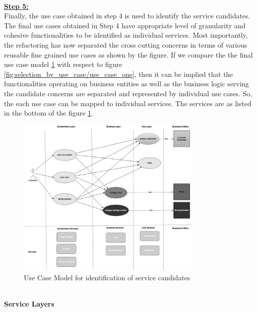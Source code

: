 \\
\textbf{\underline{Step 5:}}
\\
Finally, the use case obtained in step 4 is used to identify the service candidates. The final use cases obtained in Step 4 have appropriate level of granularity and cohesive functionalities to be identified as individual services. Most importantly, the refactoring has now separated the cross cutting concerns in terms of various reusable fine grained use cases as shown by the figure. If we compare the the final use case model \ref{fig:selection_by_use_case/use_case_five} with respect to figure \ref{fig:selection_by_use_case/use_case_one}, then it can be implied that the functionalities operating on business entities as well as the business logic serving the candidate concerns are separated and represented by individual use cases. So, the each use case can be mapped to individual services. The services are as listed in the bottom of the figure \ref{fig:selection_by_use_case/use_case_five}.
\\
\begin{figure}[H]
\begin{center}
\includegraphics[width=0.8\textwidth]{figures/use-case-five}
\caption{Use Case Model for identification of service candidates}
\label{fig:selection_by_use_case/use_case_five}
\end{center}
\end{figure}
\\
\textbf{Service Layers}\\
